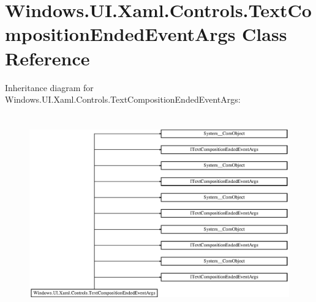 \hypertarget{class_windows_1_1_u_i_1_1_xaml_1_1_controls_1_1_text_composition_ended_event_args}{}\section{Windows.\+U\+I.\+Xaml.\+Controls.\+Text\+Composition\+Ended\+Event\+Args Class Reference}
\label{class_windows_1_1_u_i_1_1_xaml_1_1_controls_1_1_text_composition_ended_event_args}
Inheritance diagram for Windows.\+U\+I.\+Xaml.\+Controls.\+Text\+Composition\+Ended\+Event\+Args\+:\begin{figure}[H]
\begin{center}
\leavevmode
\includegraphics[height=8.603352cm]{class_windows_1_1_u_i_1_1_xaml_1_1_controls_1_1_text_composition_ended_event_args}
\end{center}
\end{figure}
